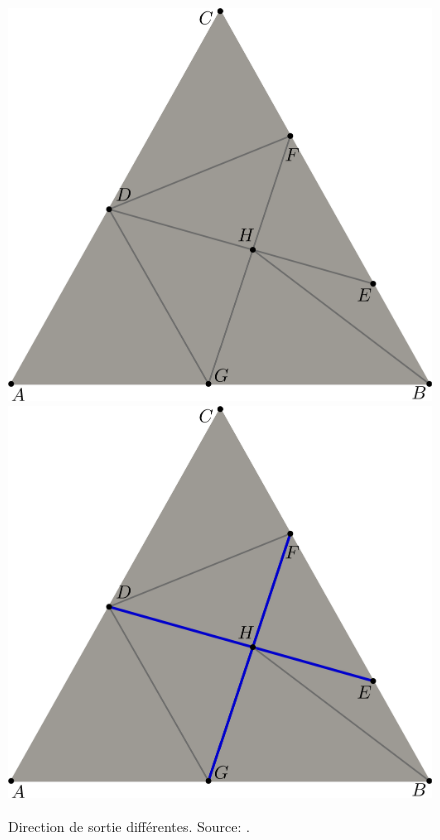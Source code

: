\begin{figure}[h!]
\centering
\includegraphics[scale=0.275]{images/retournement_arete-1.pdf}\hfill
\includegraphics[scale=0.275]{images/retournement_arete-2.pdf}
\caption{Direction de sortie différentes. Source: \cite{georgegeneration}.}
\label{fig:retournement_arete}
\end{figure}


